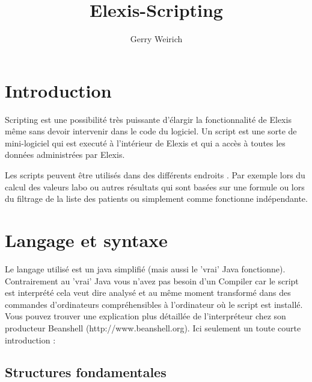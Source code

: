 \documentclass[a4paper]{scrartcl}
\begin{document}
\title{Elexis-Scripting}
\author{Gerry Weirich}
\maketitle

\section{Introduction}
Scripting est une possibilité très puissante d'élargir la fonctionnalité de Elexis même sans devoir intervenir dans le code du logiciel.  Un script est une sorte de mini-logiciel qui est executé à l'intérieur de Elexis et qui a accès à toutes les données administrées par Elexis.
\medskip

Les scripts peuvent être utilisés dans des différents endroits . Par exemple lors du calcul des valeurs labo ou autres résultats qui sont basées sur une formule ou lors du filtrage de la liste des patients ou simplement comme fonctionne indépendante.

\section{Langage et syntaxe}
Le langage utilisé est un java simplifié (mais aussi le 'vrai' Java fonctionne). Contrairement au 'vrai' Java vous n'avez pas besoin d'un Compiler car le script est interprété cela veut dire analysé et au même moment transformé dans des commandes d'ordinateurs compréhensibles à l'ordinateur où le script est installé. Vous pouvez trouver une explication plus détaillée de l'interpréteur chez son producteur Beanshell (http://www.beanshell.org). Ici seulement un toute courte introduction :

\subsection{Structures fondamentales}
\end{document}
